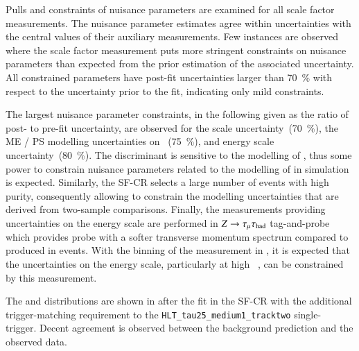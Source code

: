 Pulls and constraints of nuisance parameters are examined for all
scale factor measurements. The nuisance parameter
estimates agree within uncertainties with the central values of their
auxiliary measurements. Few instances are observed where the scale
factor measurement puts more stringent constraints on nuisance
parameters than expected from the prior estimation of the associated
uncertainty. All constrained parameters have post-fit uncertainties
larger than \SI{70}{\percent} with respect to the uncertainty prior to
the fit, indicating only mild constraints.

The largest nuisance parameter constraints, in the following given as
the ratio of post- to pre-fit uncertainty, are observed for the
\pTmissAbs scale uncertainty~(\SI{70}{\percent}), the ME / PS
modelling uncertainties on \ttbar~(\SI{75}{\percent}), and \tauhadvis
energy scale uncertainty~(\SI{80}{\percent}). The \mTW discriminant is
sensitive to the modelling of \pTmissAbs, thus some power to constrain
nuisance parameters related to the modelling of \pTmissAbs in
simulation is expected. Similarly, the SF-CR selects a large number of
\ttbar events with high purity, consequently allowing to constrain the
modelling uncertainties that are derived from two-sample
comparisons. Finally, the measurements providing uncertainties on the
\tauhadvis energy scale are performed in $Z \rightarrow \tau_{\mu} \tau_{\text{had}}$
tag-and-probe~\cite{ATLAS-CONF-2017-029} which provides probe
\tauhadvis with a softer transverse momentum spectrum compared to
\tauhadvis produced in \ttbar events. With the binning of the
measurement in \tauhadvis \pT, it is expected that the uncertainties
on the \tauhadvis energy scale, particularly at high \tauhadvis~\pT,
can be constrained by this measurement. %

The \tauhadvis \pT and \mTW distributions are shown in
 after the fit in the SF-CR with the
additional trigger-matching requirement to the
\texttt{HLT\_tau25\_medium1\_tracktwo} single-\tauhadvis
trigger. Decent agreement is observed between the background
prediction and the observed data.


